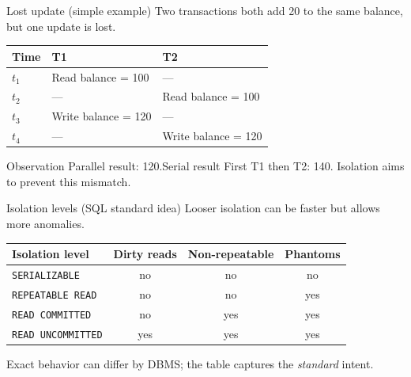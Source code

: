 \documentclass[10pt,aspectratio=169]{beamer}
\begin{document}
\begin{frame}[fragile]{Lost update (simple example)}
\small
Two transactions both add 20 to the same balance, but one update is lost.
\vspace{1mm}

\begin{center}
\begin{tabular}{@{}p{}p{}p{}@{}}
\toprule
\textbf{Time} & \textbf{T1} & \textbf{T2}\\
\midrule
$t_1$ & Read balance = 100  & --- \\
$t_2$ & ---                & Read balance = 100 \\
$t_3$ & Write balance = 120 & --- \\
$t_4$ & ---                & Write balance = 120 \\
\bottomrule
\end{tabular}
\end{center}

\vspace{1mm}
\begin{block}{Observation}
\small
Parallel result: 120.\quad Serial result First T1 then T2: 140.\quad
Isolation aims to prevent this mismatch.
\end{block}
\end{frame}

\begin{frame}{Isolation levels (SQL standard idea)}
\small
Looser isolation can be faster but allows more anomalies.

\vspace{1mm}
\begin{center}
\begin{tabular}{@{}lccc@{}}
\toprule
\textbf{Isolation level} & \textbf{Dirty reads} & \textbf{Non-repeatable} & \textbf{Phantoms}\\
\midrule
\texttt{SERIALIZABLE} & no & no & no\\
\texttt{REPEATABLE READ} & no & no & yes\\
\texttt{READ COMMITTED} & no & yes & yes\\
\texttt{READ UNCOMMITTED} & yes & yes & yes\\
\bottomrule
\end{tabular}
\end{center}

\vspace{1mm}
\footnotesize Exact behavior can differ by DBMS; the table captures the \emph{standard} intent.
\end{frame}
\end{document}
